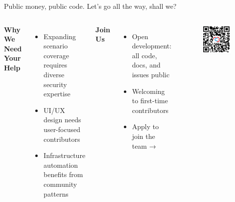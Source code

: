 \documentclass[aspectratio=169]{beamer}
\begin{document}
\begin{frame}{Public money, public code. Let's go all the way, shall we?}
  \begin{columns}[T]
    \textbf{Why We Need Your Help}
    \begin{itemize}
      \item Expanding scenario coverage requires diverse security expertise
      \item UI/UX design needs user-focused contributors
      \item Infrastructure automation benefits from community patterns
    \end{itemize}
    
    \textbf{Join Us}
    \begin{itemize}
      \item Open development: all code, docs, and issues public
      \item Welcoming to first-time contributors
      \item Apply to join the team →
    \end{itemize}
    
    \vspace{10mm}
    \begin{figure}
      \centering
      \includegraphics[width=\textwidth]{images/work-with-us-qrcode.png}
    \end{figure}
  \end{columns}
\end{frame}
\end{document}
